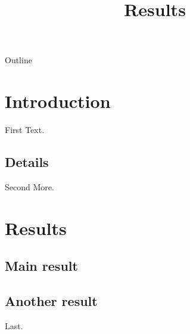 \documentclass{beamer}
\title{Results}
\begin{document}
\begin{frame}{Outline}
\tableofcontents
\end{frame}
\section{Introduction}
\begin{frame}{First}
Text.
\end{frame}
\subsection{Details}
\begin{frame}{Second}
More.
\end{frame}
\section{Results}
\subsection{Main result}
\subsection{Another result}
\begin{frame}
Last.
\end{frame}
\end{document}
